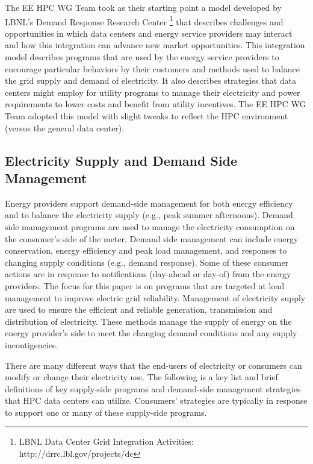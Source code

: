 The EE HPC WG Team took as their starting point a model developed by LBNL's 
Demand Response Research Center \footnote{LBNL
Data Center Grid Integration Activities: http://drrc.lbl.gov/projects/dc} that
describes challenges and opportunities in which data centers and energy service providers may
interact and how this integration can advance new market opportunities. This
integration model describes programs that are used by the energy service
providers to encourage particular behaviors by their customers and methods used
to balance the grid supply and demand of electricity. It also describes
strategies that data centers might employ for utility programs to manage their
electricity and power requirements to lower costs and benefit from utility incentives. The EE HPC WG Team adopted
this model with slight tweaks to reflect the HPC environment (versus the
general data center).


\subsection{Electricity Supply and Demand Side Management}

Energy providers support demand-side management for both energy efficiency and to balance the electricity supply (e.g., peak summer afternoons). 
Demand side management programs are used to manage the electricity consumption on the consumer’s side of the meter.  
Demand side management can include energy conservation, energy efficiency and peak load management, and responses to 
changing supply conditions (e.g., demand response). Some of these consumer actions are in response to notifications (day-ahead or day-of) from the energy providers. The focus for this paper is on programs that are targeted at load management to improve electric grid reliability. 
Management of electricity supply are used to ensure the efficient and reliable generation, transmission and distribution of 
electricity.  These methods 
manage the supply of energy on the energy provider’s side to meet the changing demand conditions and any supply incontigencies. 

There are many different ways that the end-users of electricity or consumers can modify or change their electricity use. 
The following is a key list and 
brief definitions of key supply-side programs and demand-side management strategies that HPC data centers can utilize. 
Consumers' strategies are typically in response to support one or many of these supply-side programs.



